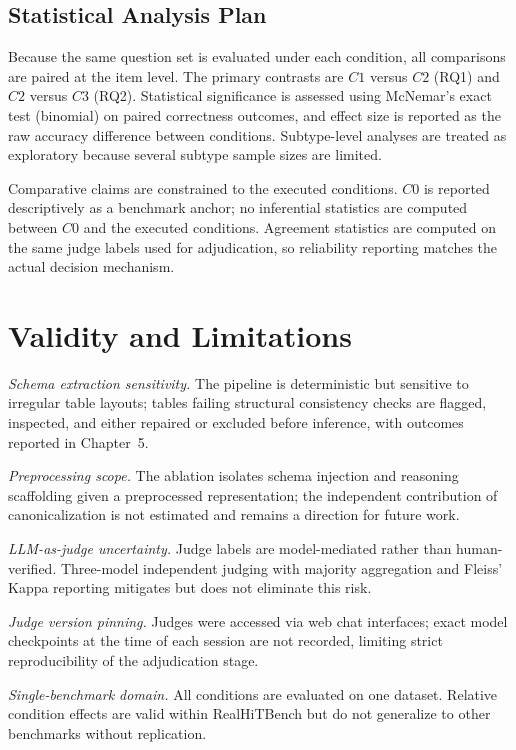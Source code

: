 ﻿\documentclass[a4paper]{article}
\begin{document}
\subsection{Statistical Analysis Plan}

Because the same question set is evaluated under each condition, all comparisons are paired at the item level. The primary contrasts are \(C1\) versus \(C2\) (RQ1) and \(C2\) versus \(C3\) (RQ2). Statistical significance is assessed using McNemar's exact test (binomial) on paired correctness outcomes, and effect size is reported as the raw accuracy difference between conditions. Subtype-level analyses are treated as exploratory because several subtype sample sizes are limited.

Comparative claims are constrained to the executed conditions. \(C0\) is reported descriptively as a benchmark anchor; no inferential statistics are computed between \(C0\) and the executed conditions. Agreement statistics are computed on the same judge labels used for adjudication, so reliability reporting matches the actual decision mechanism.

\section{Validity and Limitations}
\label{sec:validity}

\textit{Schema extraction sensitivity.} The pipeline is 
deterministic but sensitive to irregular table layouts; tables 
failing structural consistency checks are flagged, inspected, 
and either repaired or excluded before inference, with outcomes 
reported in Chapter~5.

\textit{Preprocessing scope.} The ablation isolates schema 
injection and reasoning scaffolding given a preprocessed 
representation; the independent contribution of canonicalization 
is not estimated and remains a direction for future work.

\textit{LLM-as-judge uncertainty.} Judge labels are 
model-mediated rather than human-verified. Three-model 
independent judging with majority aggregation and Fleiss' Kappa 
reporting mitigates but does not eliminate this risk.

\textit{Judge version pinning.} Judges were accessed via web 
chat interfaces; exact model checkpoints at the time of each 
session are not recorded, limiting strict reproducibility of the 
adjudication stage.

\textit{Single-benchmark domain.} All conditions are evaluated 
on one dataset. Relative condition effects are valid within 
RealHiTBench but do not generalize to other benchmarks without 
replication.
\end{document}
